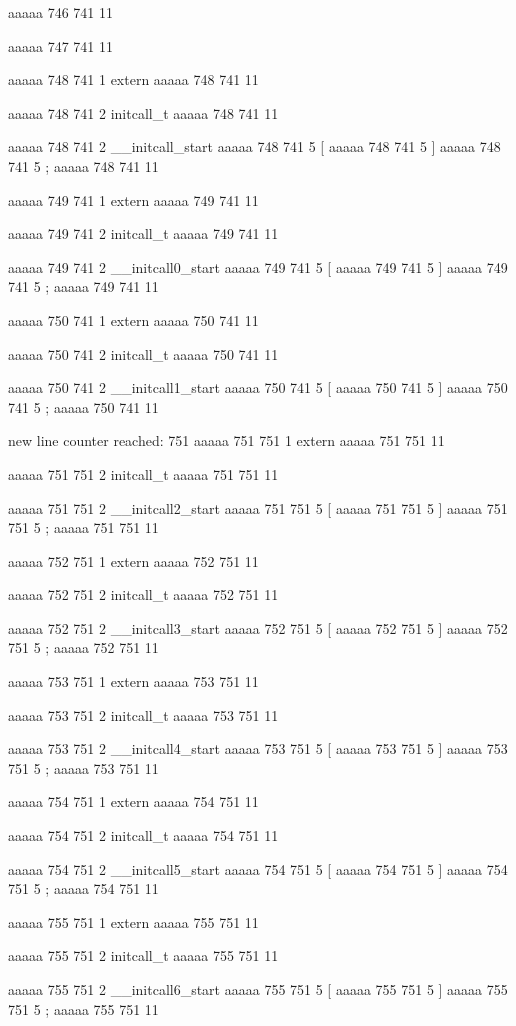 aaaaa 746 741
11


aaaaa 747 741
11


aaaaa 748 741
1
extern
aaaaa 748 741
11
 
aaaaa 748 741
2
initcall_t
aaaaa 748 741
11
 
aaaaa 748 741
2
__initcall_start
aaaaa 748 741
5
[
aaaaa 748 741
5
]
aaaaa 748 741
5
;
aaaaa 748 741
11


aaaaa 749 741
1
extern
aaaaa 749 741
11
 
aaaaa 749 741
2
initcall_t
aaaaa 749 741
11
 
aaaaa 749 741
2
__initcall0_start
aaaaa 749 741
5
[
aaaaa 749 741
5
]
aaaaa 749 741
5
;
aaaaa 749 741
11


aaaaa 750 741
1
extern
aaaaa 750 741
11
 
aaaaa 750 741
2
initcall_t
aaaaa 750 741
11
 
aaaaa 750 741
2
__initcall1_start
aaaaa 750 741
5
[
aaaaa 750 741
5
]
aaaaa 750 741
5
;
aaaaa 750 741
11


new line counter reached: 751
aaaaa 751 751
1
extern
aaaaa 751 751
11
 
aaaaa 751 751
2
initcall_t
aaaaa 751 751
11
 
aaaaa 751 751
2
__initcall2_start
aaaaa 751 751
5
[
aaaaa 751 751
5
]
aaaaa 751 751
5
;
aaaaa 751 751
11


aaaaa 752 751
1
extern
aaaaa 752 751
11
 
aaaaa 752 751
2
initcall_t
aaaaa 752 751
11
 
aaaaa 752 751
2
__initcall3_start
aaaaa 752 751
5
[
aaaaa 752 751
5
]
aaaaa 752 751
5
;
aaaaa 752 751
11


aaaaa 753 751
1
extern
aaaaa 753 751
11
 
aaaaa 753 751
2
initcall_t
aaaaa 753 751
11
 
aaaaa 753 751
2
__initcall4_start
aaaaa 753 751
5
[
aaaaa 753 751
5
]
aaaaa 753 751
5
;
aaaaa 753 751
11


aaaaa 754 751
1
extern
aaaaa 754 751
11
 
aaaaa 754 751
2
initcall_t
aaaaa 754 751
11
 
aaaaa 754 751
2
__initcall5_start
aaaaa 754 751
5
[
aaaaa 754 751
5
]
aaaaa 754 751
5
;
aaaaa 754 751
11


aaaaa 755 751
1
extern
aaaaa 755 751
11
 
aaaaa 755 751
2
initcall_t
aaaaa 755 751
11
 
aaaaa 755 751
2
__initcall6_start
aaaaa 755 751
5
[
aaaaa 755 751
5
]
aaaaa 755 751
5
;
aaaaa 755 751
11


